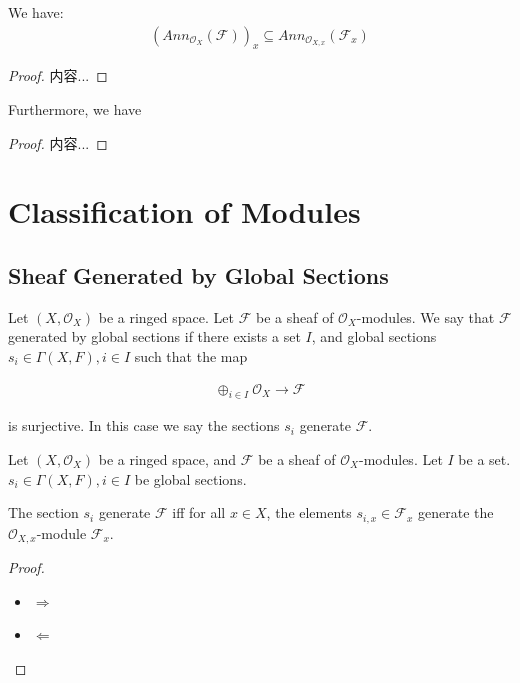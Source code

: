 \documentclass[Total.tex]{subfiles}
\begin{document}
				\begin{lemma}
					We have:
					\begin{gather*}
						(Ann_{\mathcal{O}_X}(\mathcal{F}))_x\subseteq Ann_{\mathcal{O}_{X,x}}(\mathcal{F}_x)
					\end{gather*}
				\end{lemma}
				\begin{proof}
					内容...
				\end{proof}
				Furthermore, we have
				\begin{proposition}
					
				\end{proposition}
				\begin{proof}
					内容...
				\end{proof}
		\section{Classification of Modules}
		
			\subsection{Sheaf Generated by Global Sections}
			
			\begin{Def}
				Let $(X,\mathcal{O}_X)$ be a ringed space. Let $\mathcal{F}$ be a sheaf of $\mathcal{O}_X$-modules. We say that $\mathcal{F}$ generated by global sections if there exists a set $I$, and global sections $s_i\in \Gamma(X,F),i\in I$ such that the map
				
				\begin{gather*}
					\oplus_{i\in I} \mathcal{O}_X\rightarrow \mathcal{F}
				\end{gather*}
				
				is surjective. In this case we say the sections $s_i$ generate $\mathcal{F}$.
			\end{Def}
			
			
			\begin{lemma}
				Let $(X,\mathcal{O}_X)$ be a ringed space, and $\mathcal{F}$ be a sheaf of $\mathcal{O}_X$-modules. Let $I$ be a set. $s_i\in \Gamma(X,F),i\in I$ be global sections.
				
				The section $s_i$ generate $\mathcal{F}$ iff for all $x\in X$, the elements $s_{i,x}\in \mathcal{F}_x$ generate the $\mathcal{O}_{X,x}$-module $\mathcal{F}_x$.
			\end{lemma} 
			
			\begin{proof}
				\begin{itemize}
					\item $\Rightarrow$
					\item $\Leftarrow$
				\end{itemize}
			\end{proof}
			
\end{document}
